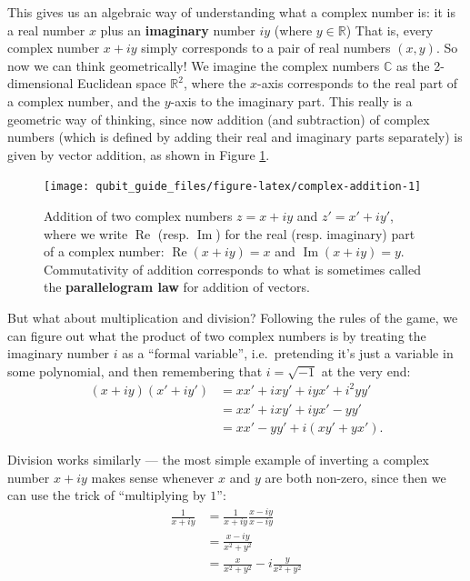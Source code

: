 \documentclass[fleqn,a4paper]{article}
\theoremstyle{definition}
\theoremstyle{definition}
\theoremstyle{definition}
\theoremstyle{definition}
\theoremstyle{remark}
\begin{document}
This gives us an algebraic way of understanding what a complex number is: it is a real number \(x\) plus an \textbf{imaginary} number \(iy\) (where \(y\in\mathbb{R}\))
That is, every complex number \(x+iy\) simply corresponds to a pair of real numbers \((x,y)\).
So now we can think geometrically!
We imagine the complex numbers \(\mathbb{C}\) as the 2-dimensional Euclidean space \(\mathbb{R}^2\), where the \(x\)-axis corresponds to the real part of a complex number, and the \(y\)-axis to the imaginary part.
This really is a geometric way of thinking, since now addition (and subtraction) of complex numbers (which is defined by adding their real and imaginary parts separately) is given by vector addition, as shown in Figure \ref{fig:complex-addition}.



\begin{figure}[H]

{\centering \texttt{[image: qubit\_guide\_files/figure-latex/complex-addition-1]} 

}

\caption{Addition of two complex numbers \(z=x+iy\) and \(z'=x'+iy'\), where we write \(\operatorname{Re}\) (resp. \(\operatorname{Im}\)) for the real (resp. imaginary) part of a complex number: \(\operatorname{Re}(x+iy)=x\) and \(\operatorname{Im}(x+iy)=y\). Commutativity of addition corresponds to what is sometimes called the \textbf{parallelogram law} for addition of vectors.}\label{fig:complex-addition}
\end{figure}

But what about multiplication and division?
Following the rules of the game, we can figure out what the product of two complex numbers is by treating the imaginary number \(i\) as a ``formal variable'', i.e.~pretending it's just a variable in some polynomial, and then remembering that \(i=\sqrt{-1}\) at the very end:
\[
  \begin{aligned}
    (x+iy)(x'+iy')
    &= xx'+ixy'+iyx'+i^2yy'
  \\&= xx'+ixy'+iyx'-yy'
  \\&= xx'-yy'+i(xy'+yx').
  \end{aligned}
\]

Division works similarly --- the most simple example of inverting a complex number \(x+iy\) makes sense whenever \(x\) and \(y\) are both non-zero, since then we can use the trick of ``multiplying by \(1\)'':
\[
  \begin{aligned}
    \frac{1}{x+iy}
    &= \frac{1}{x+iy}\frac{x-iy}{x-iy}
  \\&= \frac{x-iy}{x^2+y^2}
  \\&= \frac{x}{x^2+y^2}-i\frac{y}{x^2+y^2}
  \end{aligned}
\]
\end{document}
